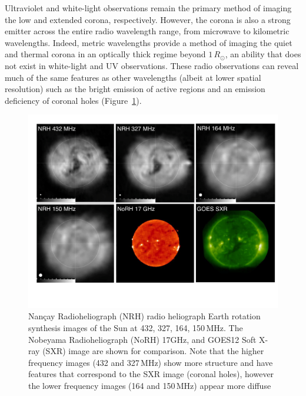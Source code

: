 Ultraviolet and white-light observations remain the primary method of imaging the low and extended corona, respectively. However, the corona is also a strong emitter across the entire radio wavelength range, from microwave to kilometric wavelengths. Indeed, metric wavelengths provide a method of imaging the quiet and thermal corona in an optically thick regime beyond $1\,R_{\odot}$, an ability that does not exist in white-light and UV observations. These radio observations can reveal much of the same features as other wavelengths (albeit at lower spatial resolution) such as the bright emission of active regions and an emission deficiency of coronal holes (Figure~\ref{fig:lowfreq}).
\begin{figure}[t!]
\begin{center}
\includegraphics[scale=0.5, trim=0.5cm 3cm 0cm 2cm]{images/nrh_images_mercier.pdf}
\caption[Comparison of soft X-ray and low frequency radio observations of the corona]{{\color{blue}Nan\c{c}ay Radioheliograph (NRH) radio heliograph Earth rotation synthesis images of the Sun at 432, 327, 164, 150\,MHz. The Nobeyama Radioheliograph (NoRH) 17GHz, and GOES12 Soft X-ray (SXR) image are shown for comparison. Note that the higher frequency images (432 and 327\,MHz) show more structure and have features that correspond to the SXR image (coronal holes), however the lower frequency images (164 and 150\,MHz) appear more diffuse \citep{mercier2009}}}
\label{fig:lowfreq}
\end{center}
\end{figure}

